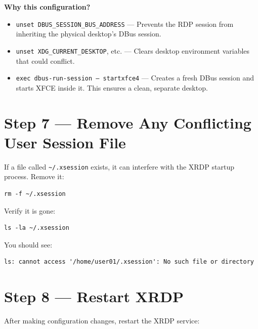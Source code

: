 \documentclass[a4paper,12pt]{article}
\newcommand{\code}[1]{\texttt{\small #1}}
\begin{document}
\begin{notebox}
\textbf{Why this configuration?}

\begin{itemize}[leftmargin=1.5em]
    \item \code{unset DBUS\_SESSION\_BUS\_ADDRESS} --- Prevents the RDP session from inheriting the physical desktop's DBus session.
    \item \code{unset XDG\_CURRENT\_DESKTOP}, etc. --- Clears desktop environment variables that could conflict.
    \item \code{exec dbus-run-session -- startxfce4} --- Creates a fresh DBus session and starts XFCE inside it. This ensures a clean, separate desktop.
\end{itemize}
\end{notebox}

\section{Step 7 --- Remove Any Conflicting User Session File}

If a file called \code{\textasciitilde/.xsession} exists, it can interfere with the XRDP startup process. Remove it:

\begin{lstlisting}[style=bashstyle]
rm -f ~/.xsession
\end{lstlisting}

Verify it is gone:

\begin{lstlisting}[style=bashstyle]
ls -la ~/.xsession
\end{lstlisting}

You should see:

\begin{lstlisting}[style=textstyle]
ls: cannot access '/home/user01/.xsession': No such file or directory
\end{lstlisting}

\section{Step 8 --- Restart XRDP}

After making configuration changes, restart the XRDP service:
\end{document}
